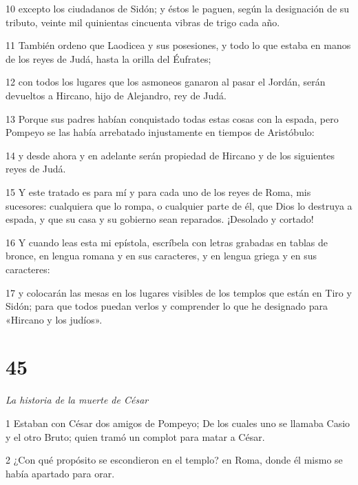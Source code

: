 \par 10 excepto los ciudadanos de Sidón; y éstos le paguen, según la designación de su tributo, veinte mil quinientas cincuenta vibras de trigo cada año.

\par 11 También ordeno que Laodicea y sus posesiones, y todo lo que estaba en manos de los reyes de Judá, hasta la orilla del Éufrates;

\par 12 con todos los lugares que los asmoneos ganaron al pasar el Jordán, serán devueltos a Hircano, hijo de Alejandro, rey de Judá.

\par 13 Porque sus padres habían conquistado todas estas cosas con la espada, pero Pompeyo se las había arrebatado injustamente en tiempos de Aristóbulo:

\par 14 y desde ahora y en adelante serán propiedad de Hircano y de los siguientes reyes de Judá.

\par 15 Y este tratado es para mí y para cada uno de los reyes de Roma, mis sucesores: cualquiera que lo rompa, o cualquier parte de él, que Dios lo destruya a espada, y que su casa y su gobierno sean reparados. ¡Desolado y cortado!

\par 16 Y cuando leas esta mi epístola, escríbela con letras grabadas en tablas de bronce, en lengua romana y en sus caracteres, y en lengua griega y en sus caracteres:

\par 17 y colocarán las mesas en los lugares visibles de los templos que están en Tiro y Sidón; para que todos puedan verlos y comprender lo que he designado para «Hircano y los judíos».

\chapter{45}

\par \textit{La historia de la muerte de César}

\par 1 Estaban con César dos amigos de Pompeyo; De los cuales uno se llamaba Casio y el otro Bruto; quien tramó un complot para matar a César.

\par 2 ¿Con qué propósito se escondieron en el templo? en Roma, donde él mismo se había apartado para orar.

